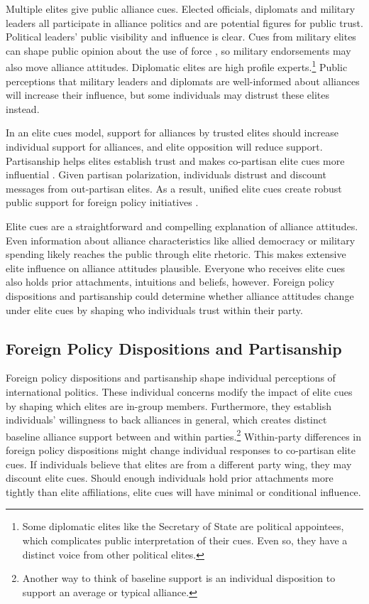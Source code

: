\documentclass[12pt]{article}
\begin{document}
Multiple elites give public alliance cues.
Elected officials, diplomats and military leaders all participate in alliance politics and are potential figures for public trust.
Political leaders' public visibility and influence is clear.
Cues from military elites can shape public opinion about the use of force \citep{Golbyetal2018}, so military endorsements may also move alliance attitudes. 
Diplomatic elites are high profile experts.\footnote{Some diplomatic elites like the Secretary of State are political appointees, which complicates public interpretation of their cues. Even so, they have a distinct voice from other political elites.}
Public perceptions that military leaders and diplomats are well-informed about alliances will increase their influence, but some individuals may distrust these elites instead.


In an elite cues model, support for alliances by trusted elites should increase individual support for alliances, and elite opposition will reduce support.   
Partisanship helps elites establish trust and makes co-partisan elite cues more influential \citep{Druckmanetal2013}.
Given partisan polarization, individuals distrust and discount messages from out-partisan elites.
As a result, unified elite cues create robust public support for foreign policy initiatives \citep{Berinsky2007}.


Elite cues are a straightforward and compelling explanation of alliance attitudes.
Even information about alliance characteristics like allied democracy or military spending likely reaches the public through elite rhetoric. 
This makes extensive elite influence on alliance attitudes plausible. 
Everyone who receives elite cues also holds prior attachments, intuitions and beliefs, however.
Foreign policy dispositions and partisanship could determine whether alliance attitudes change under elite cues by shaping who individuals trust within their party.


\subsection{Foreign Policy Dispositions and Partisanship}


Foreign policy dispositions and partisanship shape individual perceptions of international politics. 
These individual concerns modify the impact of elite cues by shaping which elites are in-group members.
Furthermore, they establish individuals' willingness to back alliances in general, which creates distinct baseline alliance support between and within parties.\footnote{Another way to think of baseline support is an individual disposition to support an average or typical alliance.}
Within-party differences in foreign policy dispositions might change individual responses to co-partisan elite cues.
If individuals believe that elites are from a different party wing, they may discount elite cues.  
Should enough individuals hold prior attachments more tightly than elite affiliations, elite cues will have minimal or conditional influence.
\end{document}
